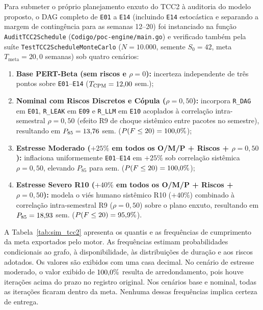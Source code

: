 \documentclass[12pt,openany,oneside,a4paper,english,brazilian,sumario=tradicional]{abntex2}
\begin{document}
Para submeter o próprio planejamento enxuto do TCC2 à auditoria do modelo proposto, o DAG completo de \texttt{E01} a \texttt{E14} (incluindo \texttt{E14} estocástica e separando a margem de contingência para as semanas 12--20) foi instanciado na função \texttt{AuditTCC2Schedule} (\texttt{Codigo/\allowbreak poc-engine/\allowbreak main.go}) e verificado também pela suíte \texttt{TestTCC2ScheduleMonteCarlo} ($N=10.000$, semente $S_0=42$, meta $T_{\mathrm{meta}} = 20{,}0$ semanas) sob quatro cenários:
\begin{enumerate}
  \item \textbf{Base PERT-Beta (sem riscos e $\rho=0$):} incerteza independente de três pontos sobre \texttt{E01}--\texttt{E14} ($T_{\mathrm{CPM}} = 12{,}00{}$ sem.);
  \item \textbf{Nominal com Riscos Discretos e Cópula ($\rho=0{,}50$):} incorpora \texttt{R\_\allowbreak DAG} em \texttt{E01}, \texttt{R\_\allowbreak LEAK} em \texttt{E09} e \texttt{R\_\allowbreak LLM} em \texttt{E10} acoplados à correlação intra-semestral $\rho=0{,}50$ (efeito R9 de choque sistêmico entre pacotes no semestre), resultando em $P_{85} = 13{,}76{}$ sem. ($P(F \le 20) = 100{,}0{}\%$);
  \item \textbf{Estresse Moderado ($+25\%$ em todos os O/M/P + Riscos + $\rho=0{,}50$):} inflaciona uniformemente \texttt{E01}--\texttt{E14} em $+25\%$ sob correlação sistêmica $\rho=0{,}50$, elevando $P_{85}$ para \tccDoisStressPoitentaeCinco{} sem. ($P(F \le 20) = 100{,}0{}\%$);
  \item \textbf{Estresse Severo R10 ($+40\%$ em todos os O/M/P + Riscos + $\rho=0{,}50$):} modela o viés humano sistêmico R10 ($+40\%$) combinado à correlação intra-semestral R9 ($\rho=0{,}50$) sobre o plano enxuto, resultando em $P_{85} = 18{,}93{}$ sem. ($P(F \le 20) = 95{,}9{}\%$).
\end{enumerate}

A Tabela~\ref{tab:sim_tcc2} apresenta os quantis e as frequências de cumprimento da meta exportados pelo motor. As frequências estimam probabilidades condicionais ao grafo, à disponibilidade, às distribuições de duração e aos riscos adotados. Os valores são exibidos com uma casa decimal. No cenário de estresse moderado, o valor exibido de $100{,}0{}\%$ resulta de arredondamento, pois houve iterações acima do prazo no registro original. Nos cenários base e nominal, todas as iterações ficaram dentro da meta. Nenhuma dessas frequências implica certeza de entrega.
\end{document}
